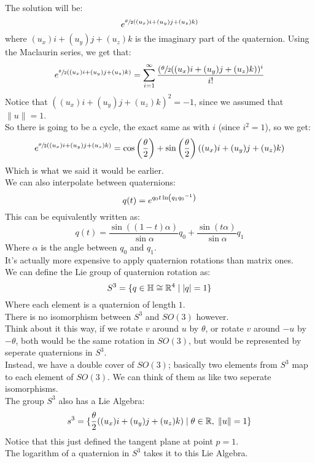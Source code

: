 \documentclass[12pt]{article}
\begin{document}
The solution will be:
\[ e^{\sfrac{\theta}{2}((u_x)i + (u_y)j + (u_z)k)} \]
where $(u_x)i + (u_y)j + (u_z)k$
is the imaginary part of the quaternion.
Using the Maclaurin series,
we get that:
\[ e^{\sfrac{\theta}{2}((u_x)i + (u_y)j + (u_z)k)}
= \sum_{i = 1}^{\infty}
\dfrac{(\sfrac{\theta}{2}
((u_x)i + (u_y)j + (u_z)k))^i}{i!} \]
Notice that $((u_x)i + (u_y)j + (u_z)k)^2 = -1$,
since we assumed that $\|u\| = 1$. \\
So there is going to be a cycle,
the exact same as with $i$ (since $i^2 = 1$),
so we get:
\[ e^{\sfrac{\theta}{2}((u_x)i + (u_y)j + (u_z)k)}
=  \cos \left( \dfrac{\theta}{2} \right)
+ \sin \left( \dfrac{\theta}{2} \right)
((u_x)i + (u_y)j + (u_z)k) \]
Which is what we said it would be earlier. \\

We can also interpolate between quaternions:
\[ q(t) = 
e^{{q_0t\ln\left( {q_1}{q_0}^{-1} \right)}} \]
This can be equivalently written as:
\[ q(t) = \frac{\sin((1 - t)\alpha)}{\sin \alpha} 
q_0 + \frac{\sin(t\alpha)}{\sin \alpha} q_1 \]
Where $\alpha$ is the angle between $q_0$
and $q_1$. \\

It's actually more expensive to apply
quaternion rotations than matrix ones. \\

We can define the Lie group of quaternion
rotation as:
\[ S^3 = \{ q \in \mathbb{H} \cong \mathbb{R}^4
\mid |q| = 1 \} \]
Where each element is a quaternion of
length $1$. \\

There is no isomorphism
between $S^3$ and $SO(3)$ however. \\
Think about it this way,
if we rotate $v$ around $u$ by $\theta$,
or rotate $v$ around $-u$ by $-\theta$,
both would be the same rotation in $SO(3)$,
but would be represented by seperate
quaternions in $S^3$. \\
Instead, we have a double cover of $SO(3)$;
basically two elements from $S^3$
map to each element of $SO(3)$.
We can think of them as like two seperate
isomorphisms. \\

The group $S^3$ also has a Lie Algebra:
\[ s^3 = \{ \dfrac{\theta}{2}((u_x)i + (u_y)j + (u_z)k) 
\mid \theta \in \mathbb{R}, \;  \|u\| = 1 \} \]
Notice that this just defined the tangent
plane at point $p = 1$. \\
The logarithm of a quaternion in $S^3$ takes it
to this Lie Algebra. \\
\end{document}
